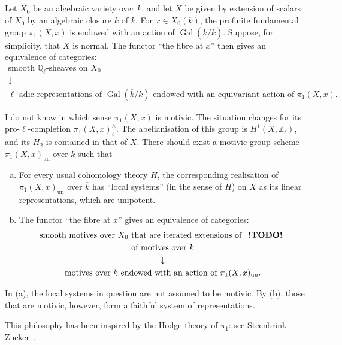 \documentclass{article}
\theoremstyle{plain}
\theoremstyle{definition}
\newcommand{\ZZ}{\mathbb{Z}}
\newcommand{\QQ}{\mathbb{Q}}
\newcommand{\un}{\mathrm{un}}
\DeclareMathOperator{\Gal}{Gal}
\newcommand{\todo}{\textbf{ !TODO! }}
\newcommand{\oldpage}[1]{\marginpar{\footnotesize$\Big\vert$ \textit{p.~#1}}}
\begin{document}
\subsection{}
\label{2.2}

Let $X_0$ be an algebraic variety over $k$, and let $X$ be given by extension of scalars of $X_0$ by an algebraic closure $\overline{k}$ of $k$.
For $x\in X_0(k)$, the profinite fundamental group $\pi_1(X,x)$ is endowed with an action of $\Gal(\overline{k}/k)$.
Suppose, for simplicity, that $X$ is normal.
The functor ``the fibre at $x$'' then gives an equivalence of categories:
\[
  \begin{gathered}
  \mbox{smooth $\QQ_\ell$-sheaves on $X_0$}
\\\downarrow
\\\mbox{$\ell$-adic representations of $\Gal(\overline{k}/k)$ endowed with an equivariant action of $\pi_1(X,x)$.}
  \end{gathered}
\]

\oldpage{153}
I do not know in which sense $\pi_1(X,x)$ is motivic.
The situation changes for its pro-$\ell$-completion $\pi_1(X,x)_\ell^\wedge$.
The abelianisation of this group is $H^1(X,\ZZ_\ell)$, and its $H_2$ is contained in that of $X$.
There should exist a motivic group scheme $\pi_1(X,x)_\un$ over $k$ such that
\begin{enumerate}[(a)]
  \item For every usual cohomology theory $H$, the corresponding realisation of $\pi_1(X,x)_\un$ over $\overline{k}$ has ``local systems'' (in the sense of $H$) on $X$ as its linear representations, which are unipotent.
  \item The functor ``the fibre at $x$'' gives an equivalence of categories:
    \[
      \begin{gathered}
        \mbox{smooth motives over $X_0$ that are iterated extensions of \todo}
      \\\mbox{of motives over $k$}
      \\\downarrow
      \\\mbox{motives over $k$ endowed with an action of $\pi_1(X,x)_\un$.}
      \end{gathered}
    \]
\end{enumerate}

In (a), the local systems in question are not assumed to be motivic.
By (b), those that are motivic, however, form a faithful system of representations.

This philosophy has been inspired by the Hodge theory of $\pi_1$: see Steenbrink--Zucker~\cite{30}.
\end{document}
